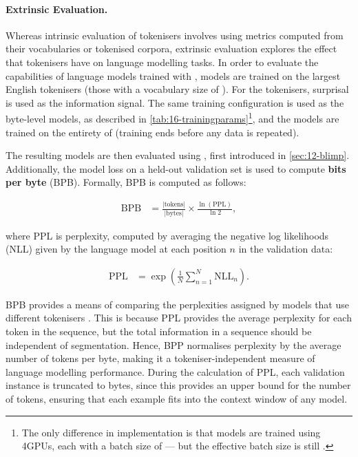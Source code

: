\paragraph{Extrinsic Evaluation.} 

Whereas intrinsic evaluation of tokenisers involves using metrics computed from their vocabularies or tokenised corpora, extrinsic evaluation explores the effect that tokenisers have on language modelling tasks. In order to evaluate the capabilities of language models trained with \bytespan, \llama models are trained on the largest English tokenisers (those with a vocabulary size of ). For the \bytespan tokenisers, surprisal is used as the information signal. The same training configuration is used as the byte-level models, as described in \cref{tab:16-trainingparams}\footnote{The only difference in implementation is that models are trained using 4GPUs, each with a batch size of  --- but the effective batch size is still .}, and the models are trained on the entirety of \fineweb (training ends before any data is repeated).

The resulting models are then evaluated using \blimp, first introduced in \cref{sec:12-blimp}. Additionally, the model loss on a held-out validation set is used to compute \textbf{bits per byte} (BPB). Formally, BPB is computed as follows:

\begin{align}
    \mathrm{BPB} &= \frac{|\mathrm{tokens}|}{|\mathrm{bytes}|} \times \frac{\ln(\mathrm{PPL})}{\ln{2}},
\end{align}

where PPL is perplexity, computed by averaging the negative log likelihoods (NLL) given by the language model at each position $n$ in the validation data:

\begin{align}
    \mathrm{PPL} &= \exp{\left(\frac{1}{N} \sum_{n=1}^{N}{\mathrm{NLL}_n} \right)}.
\end{align}

BPB provides a means of comparing the perplexities assigned by models that use different tokenisers  \citep{choe2019bridging}. This is because PPL provides the average perplexity for each token in the sequence, but the total information in a sequence should be independent of segmentation. Hence, BPP normalises perplexity by the average number of tokens per byte, making it a tokeniser-independent measure of language modelling performance. During the calculation of PPL, each validation instance is truncated to  bytes, since this provides an upper bound for the number of tokens, ensuring that each example fits into the context window of any model.

